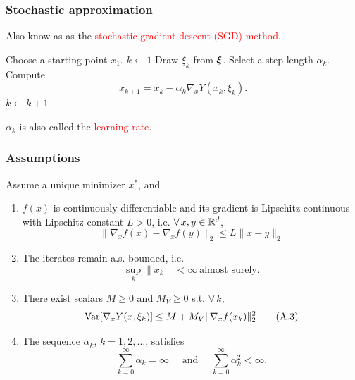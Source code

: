 \documentclass[usepdftitle=false, aspectratio=169]{beamer}
\begin{document}
\begin{frame}
\frametitle{Stochastic approximation}

Also know as as the \textcolor{red}{stochastic gradient descent (SGD) method}.

\mbox{}

\begin{algorithmic}
\State Choose a starting point $x_1$.
\State $k \leftarrow 1$
\State Draw $\xi_k$ from ${\boldsymbol{\xi}}$.
\State Select a step length $\alpha_k$.
\State Compute
$$
x_{k+1} = x_k - \alpha_k \nabla_x Y(x_k, \xi_k).
$$
\State $k \leftarrow k+1$
\EndWhile
\end{algorithmic}

\mbox{}

$\alpha_k$ is also called the \textcolor{red}{learning rate}.

\end{frame}

\begin{frame}
\frametitle{Assumptions}


Assume a unique minimizer $x^*$, and
\begin{enumerate}
\item[A.1]
$f(x)$ is continuously differentiable and its gradient is Lipschitz continuous with Lipschitz constant $L > 0$, i.e. $\forall\, x, y \in {\mathbb{R}}^d$,
\begin{equation}
\| \nabla_x f(x) - \nabla_x f(y) \|_2 \leq L \| x - y \|_2
\tag{A.1}
\label{ass:Lipschitz}
\end{equation}
\item[A.2]
The iterates remain a.s. bounded, i.e.
\begin{equation}
\sup_k \| x_k \| < \infty\ \text{almost surely}.
\tag{A.2}
\label{ass:bounds}
\end{equation}
\item[A.3]
There exist scalars $M \geq 0$ and $M_V \geq 0$ s.t. $\forall\, k$,
\begin{equation}
\operatorname{Var}[\nabla_x Y(x, \xi_k)] \leq M + M_V\| \nabla_x f(x_k)\|_2^2
\tag{A.3}
\label{ass:var}
\end{equation}
\item[A.4]
The sequence $\alpha_k$, $k=1,2,\ldots$, satisfies
\begin{equation}
\sum_{k=0}^{\infty}\alpha_k=\infty \quad \mbox{ and } \quad \sum_{k=0}^{\infty}\alpha_k^{2} < \infty.
\tag{A.4}
\label{ass:steps}
\end{equation}
\end{enumerate}

\end{frame}
\end{document}
